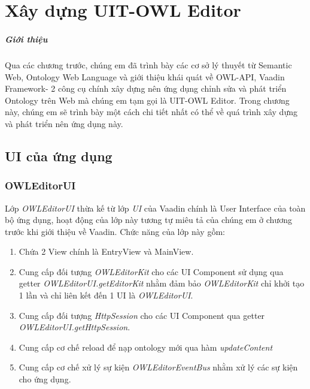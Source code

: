 \chapter{Xây dựng UIT-OWL Editor}
\paragraph{Giới thiệu} Qua các chương trước, chúng em đã trình bày các cơ sở lý thuyết từ Semantic Web, Ontology Web Language và giới thiệu khái quát về OWL-API, Vaadin Framework- 2 công cụ chính xây dựng nên ứng dụng chỉnh sửa và phát triển Ontology trên Web mà chúng em tạm gọi là UIT-OWL Editor. Trong chương này, chúng em sẽ trình bày một cách chi tiết nhất có thể về quá trình xây dựng và phát triển nên ứng dụng này.
\section{UI của ứng dụng}
\subsection{OWLEditorUI}
Lớp \textit{OWLEditorUI} thừa kế từ lớp \textit{UI} của Vaadin chính là User Interface của toàn bộ ứng dụng, hoạt động của lớp này tương tự miêu tả của chúng em ở chương trước khi giới thiệu về Vaadin. Chức năng của lớp này gồm:
\begin{enumerate}
	\item Chứa 2 View chính là EntryView và MainView.
	\item Cung cấp đối tượng \textit{OWLEditorKit} cho các UI Component sử dụng qua getter \textit{OWLEditorUI.getEditorKit} nhằm đảm bảo \textit{OWLEditorKit} chỉ khởi tạo 1 lần và chỉ liên kết đến 1 UI là \textit{OWLEditorUI}.
	\item Cung cấp đối tượng \textit{HttpSession} cho các UI Component qua getter \textit{OWLEditorUI.getHttpSession}.
	\item Cung cấp cơ chế reload để nạp ontology mới qua hàm \textit{updateContent}
	\item Cung cấp cơ chế xử lý sự kiện \textit{OWLEditorEventBus} nhằm xử lý các sự kiện cho ứng dụng.
\end{enumerate}
%
